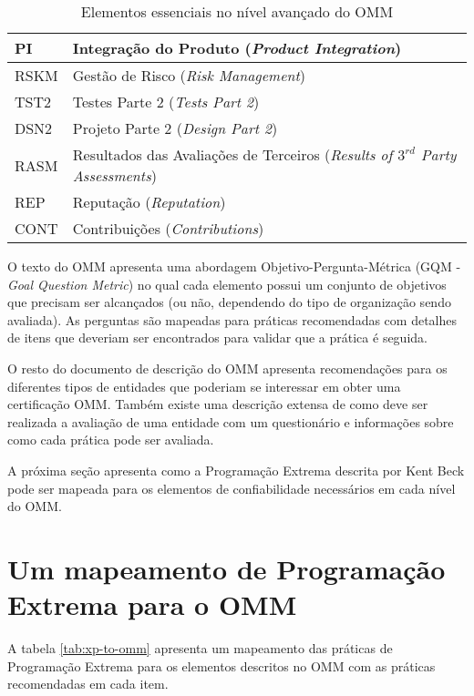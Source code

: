 \begin{table}
  \begin{tabular}{|p{2cm}|p{14cm}|}
    \hline
    PI & Integração do Produto
    (\textit{Product Integration}) \\
    \hline
    RSKM & Gestão de Risco
    (\textit{Risk Management}) \\
    \hline
    TST2 & Testes Parte 2
    (\textit{Tests Part 2}) \\
    \hline
    DSN2 & Projeto Parte 2
    (\textit{Design Part 2}) \\
    \hline
    RASM & Resultados das Avaliações de Terceiros
    (\textit{Results of $3^{rd}$ Party Assessments}) \\
    \hline
    REP & Reputação
    (\textit{Reputation}) \\
    \hline
    CONT & Contribuições
    (\textit{Contributions}) \\
    \hline
  \end{tabular}
  \caption{Elementos essenciais no nível avançado do OMM}
  \label{tab:omm-advanced}
\end{table}

O texto do OMM apresenta uma abordagem Objetivo-Pergunta-Métrica (GQM
- \textit{Goal Question Metric}) no qual cada elemento possui um
conjunto de objetivos que precisam ser alcançados (ou não, dependendo
do tipo de organização sendo avaliada). As perguntas são mapeadas para
práticas recomendadas com detalhes de itens que deveriam ser
encontrados para validar que a prática é seguida.

O resto do documento de descrição do OMM apresenta recomendações para
os diferentes tipos de entidades que poderiam se interessar em obter
uma certificação OMM. Também existe uma descrição extensa de como deve
ser realizada a avaliação de uma entidade com um questionário e
informações sobre como cada prática pode ser avaliada.

A próxima seção apresenta como a Programação Extrema descrita por Kent
Beck pode ser mapeada para os elementos de confiabilidade necessários
em cada nível do OMM.

\section{Um mapeamento de Programação Extrema para o OMM}
\label{sec:xp-em-omm}

A tabela \ref{tab:xp-to-omm} apresenta um mapeamento das práticas de
Programação Extrema para os elementos descritos no OMM com as práticas
recomendadas em cada item.

